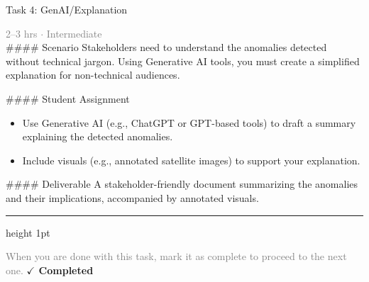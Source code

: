 \documentclass[10pt,a4paper]{article}
\begin{document}
\begin{taskbox}{Task 4: GenAI/Explanation}

    {\small \textcolor{gray}{2--3 hrs $\cdot$ Intermediate}}\\[12pt]

    \#\#\#\# Scenario  
Stakeholders need to understand the anomalies detected without technical jargon. Using Generative AI tools, you must create a simplified explanation for non-technical audiences.  

\#\#\#\# Student Assignment  
\begin{itemize}
    \item Use Generative AI (e.g., ChatGPT or GPT-based tools) to draft a summary explaining the detected anomalies.  
    \item Include visuals (e.g., annotated satellite images) to support your explanation.  
\end{itemize}

\#\#\#\# Deliverable  
A stakeholder-friendly document summarizing the anomalies and their implications, accompanied by annotated visuals.\par

    \vspace{16pt}

    \textcolor{cardBorder}{\hrule height 1pt}\vspace{8pt}

    \small \textcolor{gray}{When you are done with this task, mark it as complete to proceed to the next one.} \hfill \textbf{\textcolor{brandDark}{$\checkmark$ Completed}}

\end{taskbox}
\end{document}
